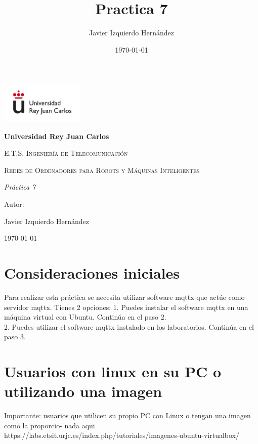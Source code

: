 \documentclass[12pt, a4paper]{report}
\title{Practica 7}
\author{Javier Izquierdo Hernández}
\date{\today}
\begin{document}
	\begin{titlepage}
		\centering
		{\includegraphics[width=0.3\textwidth]{logo}\par}
		\vspace{1cm}
		{\bfseries\LARGE Universidad Rey Juan Carlos \par}
		\vspace{1cm}
		{\scshape\Large E.T.S. Ingeniería de Telecomunicación \par}
		\vspace{3cm}
		{\scshape\Huge Redes de Ordenadores para Robots y Máquinas Inteligentes \par}
		\vspace{3cm}
		{\itshape\Large Práctica 7\par}
		\vfill
		{\Large Autor: \par}
		{\Large Javier Izquierdo Hernández \par}
		\vfill
		{\Large \today \par}
	\end{titlepage}

\newpage
\renewcommand{\contentsname}{Contenidos}
\tableofcontents
\newpage

\chapter{Consideraciones iniciales}
Para realizar esta práctica se necesita utilizar software mqttx que actúe como servidor mqttx.
Tienes 2 opciones: 1. Puedes instalar el software mqttx en una máquina virtual con Ubuntu. Continúa
en el paso 2.\\

2. Puedes utilizar el software mqttx instalado en los laboratorios. Continúa en el paso 3.

\chapter{Usuarios con linux en su PC o utilizando una imagen}
Importante: usuarios que utilicen su propio PC con Linux o tengan una imagen como la proporcio-
nada aqui https://labs.etsit.urjc.es/index.php/tutoriales/imagenes-ubuntu-virtualbox/
\end{document}
